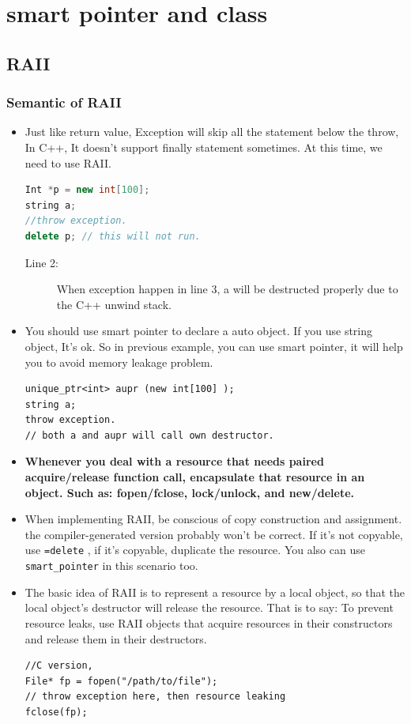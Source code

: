 \documentclass[a4paper,11pt,twoside]{book}
\begin{document}
\section{smart pointer and class}
\subsection{RAII}
\subsubsection{Semantic of RAII}
\begin{itemize}
		\item Just like return value,  Exception will skip all the statement below the throw, In C++, It doesn't support finally statement sometimes. At this time, we need to use RAII.
\begin{lstlisting}[frame=single, language=c++]
Int *p = new int[100];
string a;   
//throw exception.
delete p; // this will not run.
\end{lstlisting}
	\begin{description}
		\item[Line 2:] When exception happen in line 3, a will be destructed properly due to the C++ unwind stack.
	\end{description}
	
		\item You should use smart pointer to declare a auto object.  If you use string object, It's ok.  So in previous example,  you can use smart pointer, it will help you to avoid memory leakage problem.
\begin{lstlisting}[numbers=none]
unique_ptr<int> aupr (new int[100] );
string a;
throw exception.
// both a and aupr will call own destructor.
\end{lstlisting}
	
	\item \textbf{Whenever you deal with a resource that needs paired acquire/release function call, encapsulate that resource in an object.  Such as: fopen/fclose, lock/unlock, and new/delete.}
	
	\item When implementing RAII, be conscious of copy construction and assignment. the compiler-generated version probably won't be correct. If it's not copyable, use \texttt{=delete} , if it's copyable, duplicate the resource.  You also can use \texttt{smart\_pointer} in this scenario too.
	
	\item The basic idea of RAII  is to represent a resource by a local object, so that the local object's destructor will release the resource.  That is to say: To prevent resource leaks, use RAII objects that acquire resources in their constructors and release them in their destructors.
\begin{lstlisting}[numbers = none]
//C version,
File* fp = fopen("/path/to/file");
// throw exception here, then resource leaking
fclose(fp);
	

\end{lstlisting}
\end{itemize}
\end{document}
